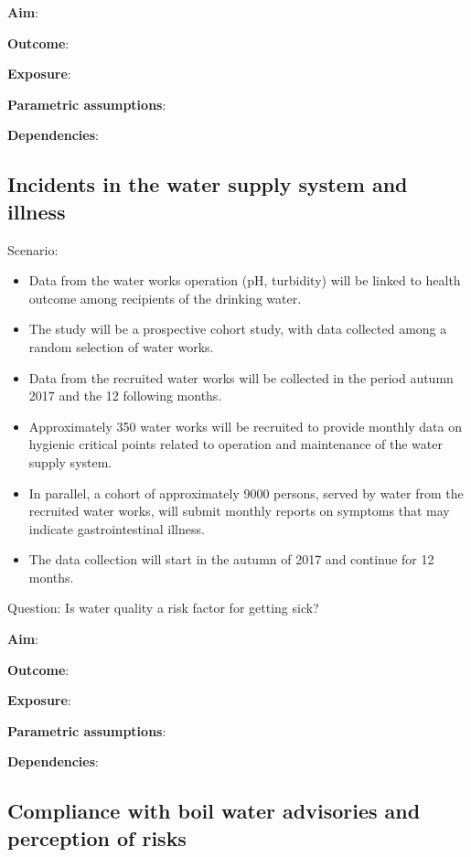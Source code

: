 \documentclass[12pt,]{article}
\providecommand{\tightlist}{%
  \setlength{\itemsep}{0pt}\setlength{\parskip}{0pt}}
\begin{document}
\textbf{Aim}:

\textbf{Outcome}:

\textbf{Exposure}:

\textbf{Parametric assumptions}:

\textbf{Dependencies}:

\subsection{Incidents in the water supply system and
illness}\label{incidents-in-the-water-supply-system-and-illness}

Scenario:

\begin{itemize}
\tightlist
\item
  Data from the water works operation (pH, turbidity) will be linked to
  health outcome among recipients of the drinking water.
\item
  The study will be a prospective cohort study, with data collected
  among a random selection of water works.
\item
  Data from the recruited water works will be collected in the period
  autumn 2017 and the 12 following months.
\item
  Approximately 350 water works will be recruited to provide monthly
  data on hygienic critical points related to operation and maintenance
  of the water supply system.
\item
  In parallel, a cohort of approximately 9000 persons, served by water
  from the recruited water works, will submit monthly reports on
  symptoms that may indicate gastrointestinal illness.
\item
  The data collection will start in the autumn of 2017 and continue for
  12 months.
\end{itemize}

Question: Is water quality a risk factor for getting sick?

\textbf{Aim}:

\textbf{Outcome}:

\textbf{Exposure}:

\textbf{Parametric assumptions}:

\textbf{Dependencies}:

\subsection{Compliance with boil water advisories and perception of
risks}\label{compliance-with-boil-water-advisories-and-perception-of-risks}
\end{document}
